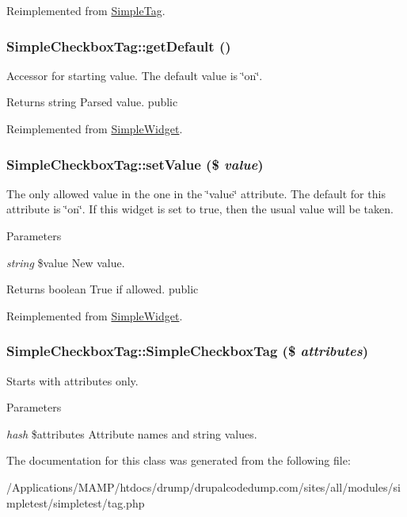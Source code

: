 Reimplemented from \hyperlink{class_simple_tag_a158fcbf8b82e7a6f7b6855c1dbe0715b}{SimpleTag}.\hypertarget{class_simple_checkbox_tag_a7d35adf28b5e7e0b891464e47ac1a6bc}{
\subsubsection[{getDefault}]{\setlength{\rightskip}{0pt plus 5cm}SimpleCheckboxTag::getDefault ()}}
\label{class_simple_checkbox_tag_a7d35adf28b5e7e0b891464e47ac1a6bc}
Accessor for starting value. The default value is \char`\"{}on\char`\"{}. \begin{DoxyReturn}{Returns}
string Parsed value.  public 
\end{DoxyReturn}


Reimplemented from \hyperlink{class_simple_widget_a9c0702cdfee1237b1599cb920ce14ba6}{SimpleWidget}.\hypertarget{class_simple_checkbox_tag_a9ff9d413cacf20c94173be8c16022fa0}{
\subsubsection[{setValue}]{\setlength{\rightskip}{0pt plus 5cm}SimpleCheckboxTag::setValue (\$ {\em value})}}
\label{class_simple_checkbox_tag_a9ff9d413cacf20c94173be8c16022fa0}
The only allowed value in the one in the \char`\"{}value\char`\"{} attribute. The default for this attribute is \char`\"{}on\char`\"{}. If this widget is set to true, then the usual value will be taken. 
\begin{DoxyParams}{Parameters}
\item[{\em string}]\$value New value. \end{DoxyParams}
\begin{DoxyReturn}{Returns}
boolean True if allowed.  public 
\end{DoxyReturn}


Reimplemented from \hyperlink{class_simple_widget_a9e048a450e2d29a601e672deda9fa869}{SimpleWidget}.\hypertarget{class_simple_checkbox_tag_a2f8a9636c13ffb744c0e8a8b248fd4cc}{
\subsubsection[{SimpleCheckboxTag}]{\setlength{\rightskip}{0pt plus 5cm}SimpleCheckboxTag::SimpleCheckboxTag (\$ {\em attributes})}}
\label{class_simple_checkbox_tag_a2f8a9636c13ffb744c0e8a8b248fd4cc}
Starts with attributes only. 
\begin{DoxyParams}{Parameters}
\item[{\em hash}]\$attributes Attribute names and string values. \end{DoxyParams}


The documentation for this class was generated from the following file:\begin{DoxyCompactItemize}
\item 
/Applications/MAMP/htdocs/drump/drupalcodedump.com/sites/all/modules/simpletest/simpletest/tag.php\end{DoxyCompactItemize}
